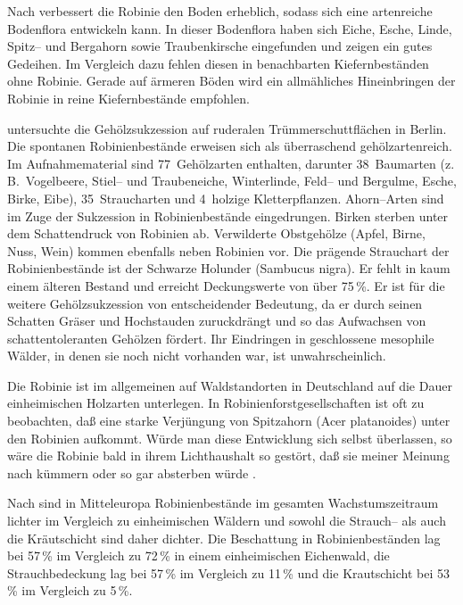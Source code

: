 \documentclass[twocolumn]{scrartcl}
\begin{document}
Nach \citet[S.~90--92]{erteld1952robinieErtrag} verbessert die Robinie
den Boden erheblich, sodass sich eine artenreiche Bodenflora
entwickeln kann. In dieser Bodenflora haben sich Eiche, Esche, Linde,
Spitz-- und Bergahorn sowie Traubenkirsche eingefunden und zeigen ein
gutes Gedeihen. Im Vergleich dazu fehlen diesen in benachbarten
Kiefernbeständen ohne Robinie. Gerade auf ärmeren Böden wird ein
allmähliches Hineinbringen der Robinie in reine Kiefernbestände
empfohlen.

\citet{kowarik1990robinie} untersuchte die Gehölzsukzession auf
ruderalen Trümmerschuttflächen in Berlin. Die spontanen
Robinienbestände erweisen sich als überraschend gehölzartenreich. Im
Aufnahmematerial sind 77~Gehölzarten enthalten, darunter 38~Baumarten
(z.\,B.\ Vogelbeere, Stiel-- und Traubeneiche, Winterlinde, Feld-- und
Bergulme, Esche, Birke, Eibe), 35~Straucharten und 4~holzige
Kletterpflanzen. Ahorn--Arten sind im Zuge der Sukzession in
Robinienbestände eingedrungen. Birken sterben unter dem Schattendruck
von Robinien ab. Verwilderte Obstgehölze (Apfel, Birne, Nuss, Wein)
kommen ebenfalls neben Robinien vor. Die prägende Strauchart der
Robinienbestände ist der Schwarze Holunder (Sambucus nigra). Er fehlt
in kaum einem älteren Bestand und erreicht Deckungswerte von über
75\,\%. Er ist für die weitere Gehölzsukzession von entscheidender
Bedeutung, da er durch seinen Schatten Gräser und Hochstauden
zuruckdrängt und so das Aufwachsen von schattentoleranten Gehölzen
fördert. Ihr Eindringen in geschlossene mesophile Wälder, in denen sie
noch nicht vorhanden war, ist unwahrscheinlich.

Die Robinie ist im allgemeinen auf Waldstandorten in Deutschland auf
die Dauer einheimischen Holzarten unterlegen. In
Robinienforstgesellschaften ist oft zu beobachten, daß eine starke
Verjüngung von Spitzahorn (Acer platanoides) unter den Robinien
aufkommt. Würde man diese Entwicklung sich selbst überlassen, so wäre
die Robinie bald in ihrem Lichthaushalt so gestört, daß sie meiner
Meinung nach kümmern oder so gar absterben würde
\citep{kohler1963robinie}.

Nach \citet{hanzelka2015robinie} sind in Mitteleuropa Robinienbestände
im gesamten Wachstumszeitraum lichter im Vergleich zu einheimischen
Wäldern und sowohl die Strauch-- als auch die Kräutschicht sind daher
dichter. Die Beschattung in Robinienbeständen lag bei 57\,\% im
Vergleich zu 72\,\% in einem einheimischen Eichenwald, die
Strauchbedeckung lag bei 57\,\% im Vergleich zu 11\,\% und die
Krautschicht bei 53\,\% im Vergleich zu 5\,\%.
\end{document}
